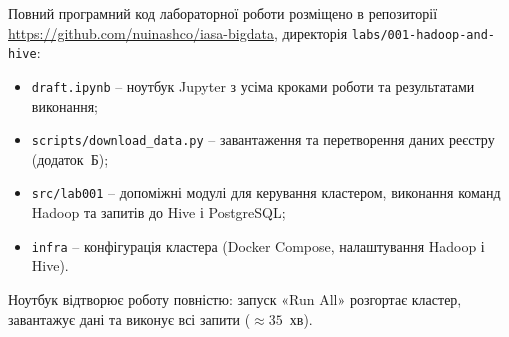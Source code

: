 \documentclass{iasa-lab}
\begin{document}
Повний програмний код лабораторної роботи розміщено в репозиторії \url{https://github.com/nuinashco/iasa-bigdata}, директорія \texttt{labs/001-hadoop-and-hive}:
\begin{itemize}
  \item \texttt{draft.ipynb} -- ноутбук Jupyter з усіма кроками роботи та результатами виконання;
  \item \texttt{scripts/download\_data.py} -- завантаження та перетворення даних реєстру (додаток~Б);
  \item \texttt{src/lab001} -- допоміжні модулі для керування кластером, виконання команд Hadoop та запитів до Hive і PostgreSQL;
  \item \texttt{infra} -- конфігурація кластера (Docker Compose, налаштування Hadoop і Hive).
\end{itemize}

Ноутбук відтворює роботу повністю: запуск «Run All» розгортає кластер, завантажує дані та виконує всі запити ($\approx 35$~хв).


\setcounter{lstlisting}{0}
\renewcommand{\thelstlisting}{Б.\arabic{lstlisting}}

\end{document}
